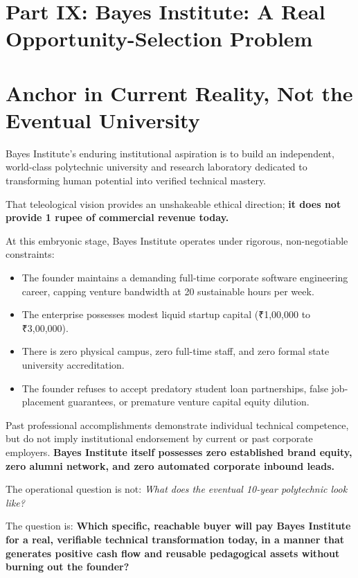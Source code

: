\section*{Part IX: Bayes Institute: A Real Opportunity-Selection Problem}

\section{Anchor in Current Reality, Not the Eventual University}

Bayes Institute's enduring institutional aspiration is to build an independent, world-class polytechnic university and research laboratory dedicated to transforming human potential into verified technical mastery.

That teleological vision provides an unshakeable ethical direction; \textbf{it does not provide 1 rupee of commercial revenue today.}

At this embryonic stage, Bayes Institute operates under rigorous, non-negotiable constraints:
\begin{itemize}[leftmargin=12pt,itemsep=1pt,topsep=1pt]
  \item The founder maintains a demanding full-time corporate software engineering career, capping venture bandwidth at 20 sustainable hours per week.
  \item The enterprise possesses modest liquid startup capital (₹1,00,000 to ₹3,00,000).
  \item There is zero physical campus, zero full-time staff, and zero formal state university accreditation.
  \item The founder refuses to accept predatory student loan partnerships, false job-placement guarantees, or premature venture capital equity dilution.
\end{itemize}

Past professional accomplishments demonstrate individual technical competence, but do not imply institutional endorsement by current or past corporate employers. \textbf{Bayes Institute itself possesses zero established brand equity, zero alumni network, and zero automated corporate inbound leads.}

The operational question is not: \textit{What does the eventual 10-year polytechnic look like?}

The question is: \textbf{Which specific, reachable buyer will pay Bayes Institute for a real, verifiable technical transformation today, in a manner that generates positive cash flow and reusable pedagogical assets without burning out the founder?}

